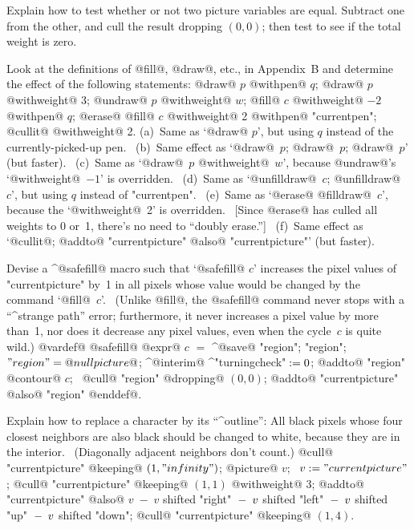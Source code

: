 {{{{\ddangerexercise Explain how to test whether or not two picture variables
are equal.
\answer Subtract one from the other, and cull the result dropping $(0,0)$;
then test to see if the total weight is zero.

\ddangerexercise Look at the definitions of @fill@, @draw@, etc., in
Appendix~B and determine the effect of the following statements:
\begindisplay
{}@draw@ $p$ @withpen@ $q$;\cr
{}@draw@ $p$ @withweight@ 3;\cr
{}@undraw@ $p$ @withweight@ $w$;\cr
{}@fill@ $c$ @withweight@ $-2$ @withpen@ $q$;\cr
{}@erase@ @fill@ $c$ @withweight@ 2 @withpen@ "currentpen";\cr
{}@cullit@ @withweight@ 2.\cr
\enddisplay
\answer (a)~Same as `@draw@ $p$', but using $q$ instead of the
currently-picked-up pen. \ (b)~Same effect as `@draw@~$p$; @draw@~$p$;
@draw@~$p$' (but faster).  \ (c)~Same as `@draw@~$p$ @withweight@~$w$',
because @undraw@'s `@withweight@~$-1$' is overridden.
\ (d)~Same as `@unfilldraw@~$c$; @unfilldraw@~$c$',
 but using $q$ instead of "currentpen".
\ (e)~Same as `@erase@ @filldraw@~$c$', because the `@withweight@~2' is
overridden. \ [Since @erase@ has culled all weights to 0 or~1, there's
no need to ``doubly erase.'']
\ (f)~Same effect as `@cullit@; @addto@ "currentpicture" @also@
"currentpicture"' (but faster).

\ddangerexercise Devise a ^@safefill@ macro such that `@safefill@ $c$' increases
the pixel values of "currentpicture" by~1 in all pixels whose value would
be changed by the command `@fill@~$c$'. \ (Unlike @fill@, the @safefill@ command
never stops with a ``^{strange path}'' error; furthermore, it never increases
a pixel value by more than~1, nor does it decrease any pixel values, even
when the cycle~$c$ is quite wild.)
\answer @vardef@ @safefill@ @expr@ $c$ $=$ ^@save@ "region";\parbreak
\quad@picture@ "region"; $"region"=@nullpicture@$;\parbreak
\quad^@interim@ ^"turningcheck"$\null:=0$;\parbreak
\quad @addto@ "region" @contour@ $c$; \
 @cull@ "region" @dropping@ $(0,0)$;\parbreak
\quad @addto@ "currentpicture" @also@ "region" @enddef@.

\ddangerexercise Explain how to replace a character by its ``^{outline}'':
All black pixels whose four closest neighbors are also
black should be changed to white, because they are in the interior.
\ (Diagonally adjacent neighbors don't count.)
\answer @cull@ "currentpicture" @keeping@ $(1,"infinity")$;\parbreak
@picture@ $v$; \  $v:="currentpicture"$;\parbreak
@cull@ "currentpicture" @keeping@ $(1,1)$ @withweight@ 3;\parbreak
@addto@ "currentpicture" @also@
 $v\;-\;v$ shifted "right"\parbreak
\qquad $\null-\;v$ shifted "left"
 $\null-\;v$ shifted "up"
 $\null-\;v$ shifted "down";\parbreak
@cull@ "currentpicture" @keeping@ $(1,4)$.

}}}}
